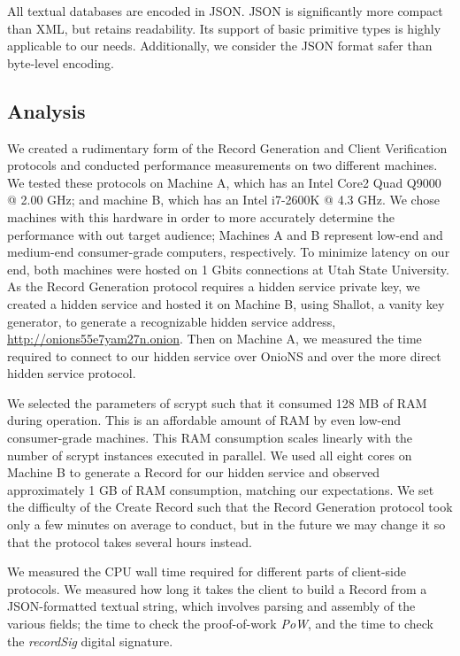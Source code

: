 \documentclass{sig-alternate}
\begin{document}
All textual databases are encoded in JSON. JSON is significantly more compact than XML, but retains readability. Its support of basic primitive types is highly applicable to our needs. Additionally, we consider the JSON format safer than byte-level encoding.

\subsection{Analysis}

We created a rudimentary form of the Record Generation and Client Verification protocols and conducted performance measurements on two different machines. We tested these protocols on Machine A, which has an Intel Core2 Quad Q9000 @ 2.00 GHz; and machine B, which has an Intel i7-2600K @ 4.3 GHz. We chose machines with this hardware in order to more accurately determine the performance with out target audience; Machines A and B represent low-end and medium-end consumer-grade computers, respectively. To minimize latency on our end, both machines were hosted on 1 Gbits connections at Utah State University. As the Record Generation protocol requires a hidden service private key, we created a hidden service and hosted it on Machine B, using Shallot, a vanity key generator, to generate a recognizable hidden service address, \url{http://onions55e7yam27n.onion}. Then on Machine A, we measured the time required to connect to our hidden service over OnioNS and over the more direct hidden service protocol.

We selected the parameters of scrypt such that it consumed 128 MB of RAM during operation. This is an affordable amount of RAM by even low-end consumer-grade machines. This RAM consumption scales linearly with the number of scrypt instances executed in parallel. We used all eight cores on Machine B to generate a Record for our hidden service and observed approximately 1 GB of RAM consumption, matching our expectations. We set the difficulty of the Create Record such that the Record Generation protocol took only a few minutes on average to conduct, but in the future we may change it so that the protocol takes several hours instead.

We measured the CPU wall time required for different parts of client-side protocols. We measured how long it takes the client to build a Record from a JSON-formatted textual string, which involves parsing and assembly of the various fields; the time to check the proof-of-work \emph{PoW}, and the time to check the \emph{recordSig} digital signature.
\end{document}
